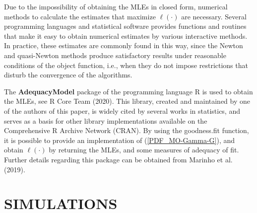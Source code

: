 \documentclass[twoside,leqno,11pt]{article}
\begin{document}
Due to the impossibility of obtaining the MLEs in closed form, numerical methods to calculate the estimates that maximize $\ell(\cdot)$ are necessary. Several programming languages and statistical software provides functions and routines that make it easy to obtain numerical estimates by various interactive methods. In practice, these estimates are commonly found in this way, since the Newton and quasi-Newton methods produce satisfactory results under reasonable conditions of the object function, i.e., when they do not impose restrictions that disturb the convergence of 
the algorithms.

The {\bf AdequacyModel} package of the programming language {\sf R} is used to obtain the MLEs, see R Core Team (2020). This library, created and maintained by one of the authors of this paper,
is widely cited by several works in statistics, and serves as 
a basis for other library implementations available on the Comprehensive R Archive Network (CRAN). By using the goodness.fit function, it is possible to provide an implementation  
of (\ref {PDF_MO-Gamma-G}), and obtain $\ell(\cdot)$ by returning the MLEs, and some measures of adequacy of fit. Further details regarding this package can be obtained from Marinho et al. (2019).


\section{SIMULATIONS}\label{sec:simulation}
\end{document}
